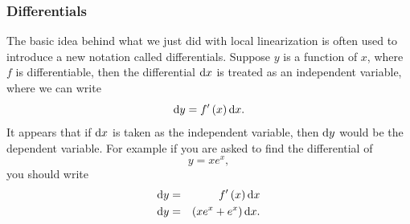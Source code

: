 \documentclass[12pt,addpoints, answers, fleqn]{exam}
\begin{document}
\subsubsection{Differentials}

The basic idea behind what we just did with local linearization is often used to introduce a new notation called differentials. Suppose $y$ is a function of $x$, where $f$ is differentiable, then the differential ${\rm{d}}x$ is treated as an independent variable, where we can write
\[
{\rm{d}} y = f'\left(x\right) {\rm{d}} x.
\]
It appears that if ${\rm{d}}x$ is taken as the independent variable, then ${\rm{d}}y$ would be the dependent variable. For example if you are asked to find the differential of
\[
y = xe^x,
\]
you should write
\begin{eqnarray*}
{\rm{d}} y &=& f'\left(x\right) {\rm{d}} x\\
{\rm{d}} y &=& \left(x e^x + e^x\right) {\rm{d}} x.
\end{eqnarray*}
\end{document}
